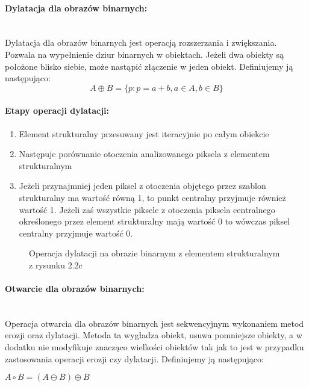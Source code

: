 \documentclass[a4paper,12pt,twoside,openany]{report}
\newcommand{\ImgPath}{.}
\begin{document}
\paragraph{Dylatacja dla obrazów binarnych:}\mbox{} \\
\indent Dylatacja dla obrazów binarnych jest operacją rozszerzania i zwiększania. Pozwala na wypełnienie dziur binarnych w obiektach. Jeżeli dwa obiekty są położone blisko siebie, może nastąpić złączenie w jeden obiekt. Definiujemy ją następująco: 
\begin{equation}
	 A \oplus B = \{p \colon p = a + b, a \in A, b \in B\} 
\end{equation}

\paragraph{Etapy operacji dylatacji:}
\begin{enumerate}
	\item Element strukturalny przesuwany jest iteracyjnie po całym obiekcie
	\item Następuje porównanie otoczenia analizowanego piksela z elementem strukturalnym
	\item Jeżeli przynajmniej jeden piksel z otoczenia objętego przez szablon strukturalny ma wartość równą 1, to punkt centralny przyjmuje również wartość 1. Jeżeli zaś wszystkie piksele z otoczenia piksela centralnego określonego przez element strukturalny mają wartość 0 to wówczas piksel centralny przyjmuje wartość 0.
\end{enumerate}

\begin{figure}[H]
	\centering
	\caption{Operacja dylatacji na obrazie binarnym z elementem strukturalnym z rysunku 2.2c}
\end{figure}

\paragraph{Otwarcie dla obrazów binarnych:}\mbox{} \\
\indent Operacja otwarcia dla obrazów binarnych jest sekwencyjnym wykonaniem metod erozji oraz dylatacji. Metoda ta wygładza obiekt, usuwa pomniejsze obiekty, a w dodatku nie modyfikuje znacząco wielkości obiektów tak jak to jest w przypadku zastosowania operacji erozji czy dylatacji. Definiujemy ją następująco:
\begin{center}
	$ A \circ B = (A \ominus B) \oplus B $ 
\end{center}
\end{document}
